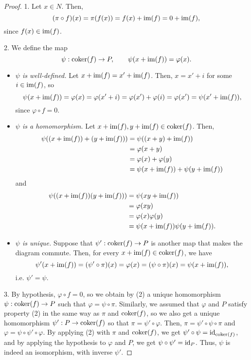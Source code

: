 \begin{proof}
	1. Let $x \in N$.
	Then,
	\[
		(\pi \circ f)(x) = \pi(f(x)) = f(x) + \operatorname{im}(f) = 0 + \operatorname{im}(f),
	\]
	since $f(x) \in \operatorname{im}(f)$.

	2. We define the map
	\[
		\psi : \operatorname{coker}(f) \to P, \qquad \psi(x + \operatorname{im}(f)) = \varphi(x).
	\]
	\begin{itemize}
		\item \emph{$\psi$ is well-defined.}
		      Let $x + \operatorname{im}(f) = x' + \operatorname{im}(f)$.
		      Then, $x = x' + i$ for some $i \in \operatorname{im}(f)$, so
		      \[
			      \psi(x + \operatorname{im}(f)) = \varphi(x) = \varphi(x' + i) = \varphi(x') + \varphi(i) = \varphi(x') = \psi(x' + \operatorname{im}(f)),
		      \]
		      since $\varphi \circ f = 0$.
		\item \emph{$\psi$ is a homomorphism.}
		      Let $x + \operatorname{im}(f), y + \operatorname{im}(f) \in \operatorname{coker}(f)$.
		      Then,
		      \begin{align*}
			      \psi((x + \operatorname{im}(f)) + (y + \operatorname{im}(f))) & = \psi((x + y) + \operatorname{im}(f))              \\
			                                        & = \varphi(x + y)                      \\
			                                        & = \varphi(x) + \varphi(y)             \\
			                                        & = \psi(x + \operatorname{im}(f)) + \psi(y + \operatorname{im}(f))
		      \end{align*}
		      and
		      \begin{align*}
			      \psi((x + \operatorname{im}(f)) (y + \operatorname{im}(f))) & = \psi(xy + \operatorname{im}(f))                  \\
			                                      & = \varphi(xy)                        \\
			                                      & = \varphi(x)\varphi(y)               \\
			                                      & = \psi(x + \operatorname{im}(f)) \psi(y + \operatorname{im}(f)).
		      \end{align*}
		\item \emph{$\psi$ is unique.}
		      Suppose that $\psi' : \operatorname{coker}(f) \to P$ is another map that makes the diagram commute.
		      Then, for every $x + \operatorname{im}(f) \in \operatorname{coker}(f)$, we have
		      \[
			      \psi'(x + \operatorname{im}(f)) = (\psi' \circ \pi)(x) = \varphi(x) = (\psi \circ \pi)(x) = \psi(x + \operatorname{im}(f)),
		      \]
		      i.e. $\psi' = \psi$.
	\end{itemize}

	3. By hypothesis, $\varphi \circ f = 0$, so we obtain by (2) a unique homomorphism $\psi : \operatorname{coker}(f) \to P$ such that $\varphi = \psi \circ \pi$.
	Similarly, we assumed that $\varphi$ and $P$ satisfy property (2) in the same way as $\pi$ and $\operatorname{coker}(f)$, so we also get a unique homomorphism $\psi' : P \to \operatorname{coker}(f)$ so that $\pi = \psi' \circ \varphi$.
	Then, $\pi = \psi' \circ \psi \circ \pi$ and $\varphi = \psi \circ \psi' \circ \varphi$.
	By applying (2) with $\pi$ and $\operatorname{coker}(f)$, we get $\psi' \circ \psi = \operatorname{id}_{\operatorname{coker}(f)}$, and by applying the hypothesis to $\varphi$ and $P$, we get $\psi \circ \psi' = \operatorname{id}_P$.
	Thus, $\psi$ is indeed an isomorphism, with inverse $\psi'$.
\end{proof}

